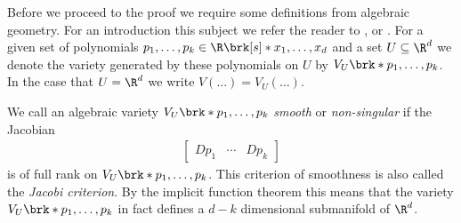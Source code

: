 Before we proceed to the proof we require some definitions from algebraic geometry.
For an introduction this subject we refer the reader to \cite{Gathmann2023}, \cite{Harris1992} or \cite{Hartshorne1977}.
For a given set of polynomials $p_1,\dots,p_k\in\R\brk[s]*{x_1,\dots,x_d}$ and a set $U\subseteq\R^d$ we denote the
variety generated by these polynomials on $U$ by $V_U\brk*{p_1,\dots,p_k}$.
In the case that $U=\R^d$ we write $V(\dots)=V_U(\dots)$.
\begin{definition}
  We call an algebraic variety $V_U\brk*{p_1,\dots,p_k}$ \emph{smooth} or \emph{non-singular}
  if the Jacobian
  \begin{align*}
    \begin{bmatrix}
      D p_1 & \cdots & D p_k
    \end{bmatrix}
  \end{align*}
  is of full rank on $V_U\brk*{p_1,\dots,p_k}$. This criterion of smoothness is also called the
  \emph{Jacobi criterion}. By the implicit function theorem this means that the variety $V_U\brk*{p_1,\dots,p_k}$
  in fact defines a $d-k$ dimensional submanifold of $\R^d$.
\end{definition}

